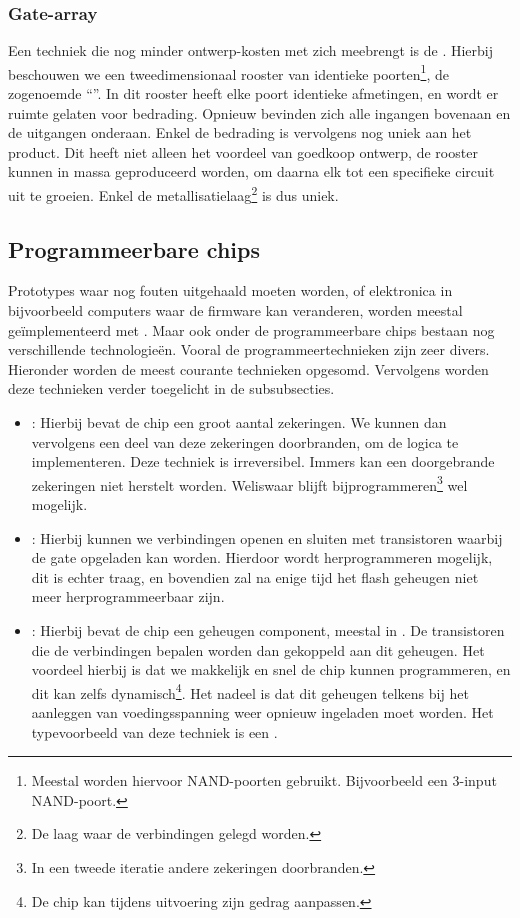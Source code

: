 \subsubsection{Gate-array}
Een techniek die nog minder ontwerp-kosten met zich meebrengt is de . Hierbij beschouwen we een tweedimensionaal rooster van identieke poorten\footnote{Meestal worden hiervoor NAND-poorten gebruikt. Bijvoorbeeld een 3-input NAND-poort.}, de zogenoemde ``''. In dit rooster heeft elke poort identieke afmetingen, en wordt er ruimte gelaten voor bedrading. Opnieuw bevinden zich alle ingangen bovenaan en de uitgangen onderaan. Enkel de bedrading is vervolgens nog uniek aan het product. Dit heeft niet alleen het voordeel van goedkoop ontwerp, de rooster kunnen in massa geproduceerd worden, om daarna elk tot een specifieke circuit uit te groeien. Enkel de metallisatielaag\footnote{De laag waar de verbindingen gelegd worden.} is dus uniek.
\subsection{Programmeerbare chips}
\label{ss:programmeerbareChips}
Prototypes waar nog fouten uitgehaald moeten worden, of elektronica in bijvoorbeeld computers waar de firmware kan veranderen, worden meestal ge\"implementeerd met . Maar ook onder de programmeerbare chips bestaan nog verschillende technologie\"en. Vooral de programmeertechnieken zijn zeer divers. Hieronder worden de meest courante technieken opgesomd. Vervolgens worden deze technieken verder toegelicht in de subsubsecties.
\begin{itemize}
 \item {}: Hierbij bevat de chip een groot aantal zekeringen. We kunnen dan vervolgens een deel van deze zekeringen doorbranden, om de logica te implementeren. Deze techniek is irreversibel. Immers kan een doorgebrande zekeringen niet herstelt worden. Weliswaar blijft bijprogrammeren\footnote{In een tweede iteratie andere zekeringen doorbranden.} wel mogelijk.
 \item {}: Hierbij kunnen we verbindingen openen en sluiten met transistoren waarbij de gate opgeladen kan worden. Hierdoor wordt herprogrammeren mogelijk, dit is echter traag, en bovendien zal na enige tijd het flash geheugen niet meer herprogrammeerbaar zijn.
 \item {}: Hierbij bevat de chip een geheugen component, meestal in . De transistoren die de verbindingen bepalen worden dan gekoppeld aan dit geheugen. Het voordeel hierbij is dat we makkelijk en snel de chip kunnen programmeren, en dit kan zelfs dynamisch\footnote{De chip kan tijdens uitvoering zijn gedrag aanpassen.}. Het nadeel is dat dit geheugen telkens bij het aanleggen van voedingsspanning weer opnieuw ingeladen moet worden. Het typevoorbeeld van deze techniek is een .
\end{itemize}
